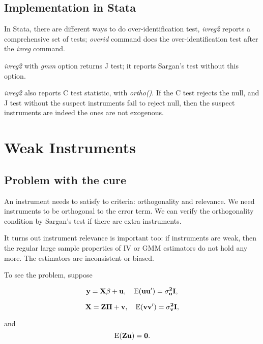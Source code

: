 \subsection{Implementation in Stata}

In Stata, there are different ways to do over-identification test, {\em
  ivreg2} reports a comprehensive set of tests; {\em overid} command
does the over-identification test after the {\em ivreg} command.  

{\em  ivreg2} with {\em  gmm} option returns J test; it reports
Sargan's test without this option.

{\em  ivreg2} also reports C test statistic, with {\em  ortho()}.  If
the C test rejects the null, and J test without the suspect
instruments fail to reject null, then the suspect instruments are
indeed the ones are not exogenous.



\section{Weak Instruments}

\subsection{Problem with the cure}

An instrument needs to satisfy to criteria: orthogonality and
relevance.  We need instruments to be orthogonal to the error term.
We can verify the orthogonality condition  by Sargan's test if there are extra
instruments.  

It turns out instrument relevance is important too: if instruments are
weak, then the regular large sample properties of IV or GMM estimators
do not hold any more.  The estimators are inconsistent or biased.

To see the problem, suppose 

\begin{equation}
\bf y=X\beta+u, \quad {\rm E} (u u')=\sigma_u^2 I, \label{eqn:wi1}
\end{equation}

\begin{equation}
\bf X=Z\Pi+v, \quad {\rm E} (v v')=\sigma_v^2 I, \label{eqn:wi2}
\end{equation}

and 
\begin{equation}
{\rm E}(\bf Z u )=0. \label{eqn:zu}
\end{equation}

